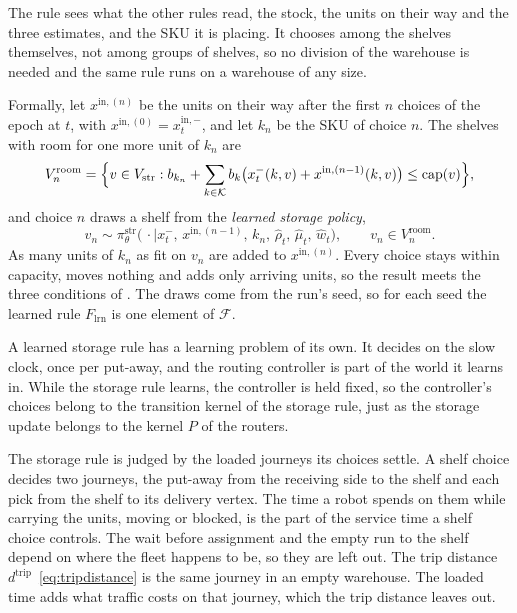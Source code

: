 The rule sees what the other rules read, the stock, the units on their way and
the three estimates, and the SKU it is placing. It chooses among the shelves
themselves, not among groups of shelves, so no division of the warehouse is
needed and the same rule runs on a warehouse of any size.

Formally, let $x^{\mathrm{in},(n)}$ be the units on their way after the first
$n$ choices of the epoch at $t$, with $x^{\mathrm{in},(0)} = x^{\mathrm{in},-}_t$,
and let $k_n$ be the SKU of choice $n$. The shelves with room for one more unit
of $k_n$ are
\[
  V^{\mathrm{room}}_n = \Bigl\{ v \in V_{\mathrm{str}} :
    b_{k_n} + \sum_{k \in \mathcal{K}} b_k
      \bigl( x_t^{-}(k,v) + x^{\mathrm{in},(n-1)}(k,v) \bigr) \le \mathrm{cap}(v) \Bigr\},
\]
and choice $n$ draws a shelf from the \emph{learned storage policy},
\begin{equation}
  v_n \sim \pi^{\mathrm{str}}_\theta\bigl(\,\cdot \mid x_t^{-},\, x^{\mathrm{in},(n-1)},\,
    k_n,\, \hat\rho_t,\, \hat\mu_t,\, \hat w_t \bigr),
  \qquad v_n \in V^{\mathrm{room}}_n .
  \label{eq:storagepolicy}
\end{equation}
As many units of $k_n$ as fit on $v_n$ are added to $x^{\mathrm{in},(n)}$. Every
choice stays within capacity, moves nothing and adds only arriving units, so the
result meets the three conditions of . The draws come
from the run's seed, so for each seed the learned rule $F_{\mathrm{lrn}}$ is one
element of $\mathcal{F}$.


A learned storage rule has a learning problem of its own. It decides on the
slow clock, once per put-away, and the routing controller is part of the world
it learns in. While the storage rule learns, the controller is held fixed, so
the controller's choices belong to the transition kernel of the storage rule,
just as the storage update belongs to the kernel $P$ of the routers.

The storage rule is judged by the loaded journeys its choices settle. A shelf
choice decides two journeys, the put-away from the receiving side to the shelf
and each pick from the shelf to its delivery vertex. The time a robot spends on
them while carrying the units, moving or blocked, is the part of the service
time a shelf choice controls. The wait before assignment and the empty run to
the shelf depend on where the fleet happens to be, so they are left out. The
trip distance $d^{\mathrm{trip}}$~\eqref{eq:tripdistance} is the same journey in
an empty warehouse. The loaded time adds what traffic costs on that journey,
which the trip distance leaves out.

